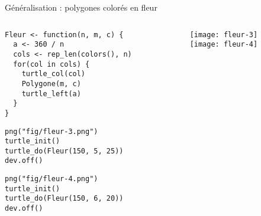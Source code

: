 \documentclass[10pt]{beamer}
\begin{document}
\begin{frame}[fragile]{Généralisation : polygones colorés en fleur}

\begin{columns}[c]
\begin{column}{0.58\textwidth}
  \begin{lstlisting}[style=editor]
Fleur <- function(n, m, c) {
  a <- 360 / n
  cols <- rep_len(colors(), n)
  for(col in cols) {
    turtle_col(col)
    Polygone(m, c)
    turtle_left(a)
  }
}
\end{lstlisting}

\begin{lstlisting}[linerange=2-3]
png("fig/fleur-3.png")
turtle_init()
turtle_do(Fleur(150, 5, 25))
dev.off()
\end{lstlisting}


\begin{lstlisting}[linerange=2-3]
png("fig/fleur-4.png")
turtle_init()
turtle_do(Fleur(150, 6, 20))
dev.off()
\end{lstlisting}

\end{column}

\begin{column}{0.38\textwidth}
  \texttt{[image: fleur-3]}
  \\
  \texttt{[image: fleur-4]}
\end{column}
\end{columns}
\end{frame}
\end{document}
